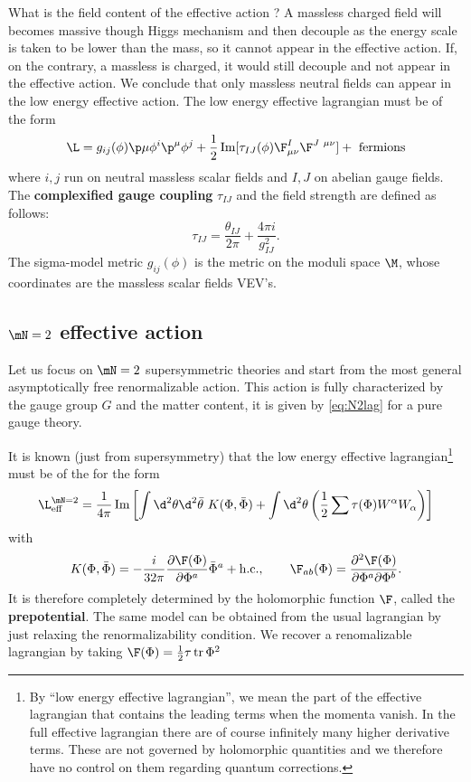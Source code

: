 \documentclass{worksheetclass}
\renewcommand{\emph}{\textbf}
\begin{document}
        What is the field content of the effective action ? A massless charged field will becomes massive though Higgs mechanism and then decouple as the energy scale is taken to be lower than the mass, so it cannot appear in the effective action. If, on the contrary, a massless is charged, it would still decouple and not appear in the effective action. We conclude that only massless neutral fields can appear in the low energy effective action. The low energy effective lagrangian must be of the form
        \begin{equation}
            \L = g_{ij}(\phi)\p\mu\phi^i\p^\mu\phi^j+\frac{1}{2}\Im[\tau_{IJ}(\phi)\F^I_{\mu\nu}\F^{J~\mu\nu}]+\text{ fermions}
        \end{equation}
        where $i,j$ run on neutral massless scalar fields and $I,J$ on abelian gauge fields. The \emph{complexified gauge coupling} $\tau_{IJ}$ and the field strength are defined as follows:
        \begin{equation}
            \tau_{IJ}=\frac{\theta_{IJ}}{2\pi}+\frac{4\pi i}{g^2_{IJ}}.
        \end{equation}
        The sigma-model metric $g_{ij}(\phi)$ is the metric on the moduli space $\M$, whose coordinates are the massless scalar fields VEV's.

    \subsection{$\mN=2$ effective action}

        Let us focus on $\mN=2$ supersymmetric theories and start from the most general asymptotically free renormalizable action. This action is fully characterized by the gauge group $G$ and the matter content, it is given by \eqref{eq:N2lag} for a pure gauge theory.

        It is known (just from supersymmetry) that the low energy effective lagrangian\footnote{By ``low energy effective lagrangian'', we mean the part of the effective lagrangian that contains the leading terms when the momenta vanish. In the full effective lagrangian there are of course infinitely many higher derivative terms. These are not governed by holomorphic quantities and we therefore have no control on them regarding quantum corrections.} must be of the for the form
        \begin{equation}
            \L^{\mN=2}_{\text{eff}} = \frac{1}{4\pi}\Im\left[\int\d^2\theta\d^2\bar{\theta}~K(\Phi,\bar{\Phi})+\int\d^2\theta\left(\frac{1}{2}\sum\tau(\Phi)W^\alpha W_\alpha\right)\right]
        \end{equation}
        with
        \begin{equation}
            K(\Phi,\bar{\Phi})=-\frac{i}{32\pi}\pdv{\F(\Phi)}{\Phi^a}\bar{\Phi}^a+\text{h.c.},\qquad \F_{ab}(\Phi)=\pdv{\F(\Phi)}{\Phi^a}{\Phi^b}.\label{eq:effectivelagftcs}
        \end{equation}
        It is therefore completely determined by the holomorphic function $\F$, called the \emph{prepotential}. The same model can be obtained from the usual lagrangian by just relaxing the renormalizability condition. We recover a renomalizable lagrangian by taking $\F(\Phi)=\frac{1}{2}\tau\tr\Phi^2$
\end{document}
